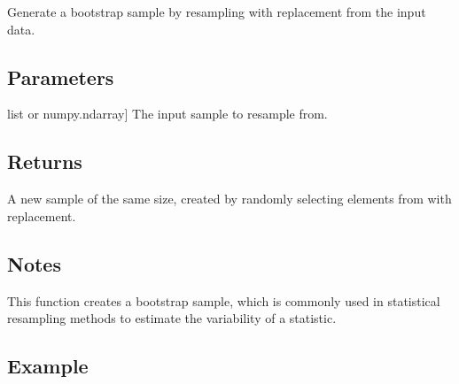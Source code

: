 \documentclass[a4paper,11pt,openany,english]{sphinxmanual}
\begin{document}
\begin{fulllineitems}
\label{\detokenize{api_bootstrap:xtremes.bootstrap.Bootstrap}}
\pysigstartsignatures
{}
\pysigstopsignatures
\sphinxAtStartPar
Generate a bootstrap sample by resampling with replacement from the input data.


\subsection{Parameters}
\label{\detokenize{api_bootstrap:id13}}\begin{description}
\sphinxlineitem{xx}{[}list or numpy.ndarray{]}
\sphinxAtStartPar
The input sample to resample from.

\end{description}


\subsection{Returns}
\label{\detokenize{api_bootstrap:id14}}\begin{description}
\sphinxAtStartPar
A new sample of the same size, created by randomly selecting elements from  with replacement.

\end{description}


\subsection{Notes}
\label{\detokenize{api_bootstrap:id15}}
\sphinxAtStartPar
This function creates a bootstrap sample, which is commonly used in statistical resampling methods to estimate 
the variability of a statistic.


\subsection{Example}
\label{\detokenize{api_bootstrap:id16}}
\begin{sphinxVerbatim}[commandchars=\\\{\}]
  \PYG{p}{[}    \PYG{p}{]}
\end{sphinxVerbatim}

\end{fulllineitems}
\end{document}
